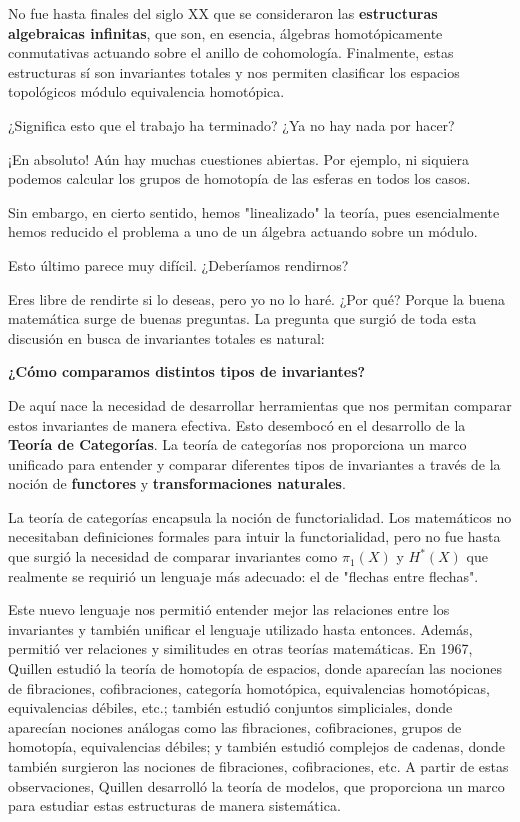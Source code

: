No fue hasta finales del siglo XX que se consideraron las \textbf{estructuras algebraicas infinitas}, que son, en esencia, álgebras homotópicamente conmutativas actuando sobre el anillo de cohomología. Finalmente, estas estructuras sí son invariantes totales y nos permiten clasificar los espacios topológicos módulo equivalencia homotópica.

\begin{pregunta}
    ¿Significa esto que el trabajo ha terminado? ¿Ya no hay nada por hacer?
\end{pregunta}

¡En absoluto! Aún hay muchas cuestiones abiertas. Por ejemplo, ni siquiera podemos calcular los grupos de homotopía de las esferas en todos los casos.

Sin embargo, en cierto sentido, hemos "linealizado" la teoría, pues esencialmente hemos reducido el problema a uno de un álgebra actuando sobre un módulo.

\begin{pregunta}
    Esto último parece muy difícil. ¿Deberíamos rendirnos?
\end{pregunta}

Eres libre de rendirte si lo deseas, pero yo no lo haré. ¿Por qué? Porque la buena matemática surge de buenas preguntas. La pregunta que surgió de toda esta discusión en busca de invariantes totales es natural:

\begin{center}
    \textbf{¿Cómo comparamos distintos tipos de invariantes?}
\end{center}

De aquí nace la necesidad de desarrollar herramientas que nos permitan comparar estos invariantes de manera efectiva. Esto desembocó en el desarrollo de la \textbf{Teoría de Categorías}. La teoría de categorías nos proporciona un marco unificado para entender y comparar diferentes tipos de invariantes a través de la noción de \textbf{functores} y \textbf{transformaciones naturales}.

La teoría de categorías encapsula la noción de functorialidad. Los matemáticos no necesitaban definiciones formales para intuir la functorialidad, pero no fue hasta que surgió la necesidad de comparar invariantes como $\pi_1(X)$ y $H^*(X)$ que realmente se requirió un lenguaje más adecuado: el de "flechas entre flechas".

Este nuevo lenguaje nos permitió entender mejor las relaciones entre los invariantes y también unificar el lenguaje utilizado hasta entonces. Además, permitió ver relaciones y similitudes en otras teorías matemáticas. En 1967, Quillen estudió la teoría de homotopía de espacios, donde aparecían las nociones de fibraciones, cofibraciones, categoría homotópica, equivalencias homotópicas, equivalencias débiles, etc.; también estudió conjuntos simpliciales, donde aparecían nociones análogas como las fibraciones, cofibraciones, grupos de homotopía, equivalencias débiles; y también estudió complejos de cadenas, donde también surgieron las nociones de fibraciones, cofibraciones, etc. A partir de estas observaciones, Quillen desarrolló la teoría de modelos, que proporciona un marco para estudiar estas estructuras de manera sistemática.

